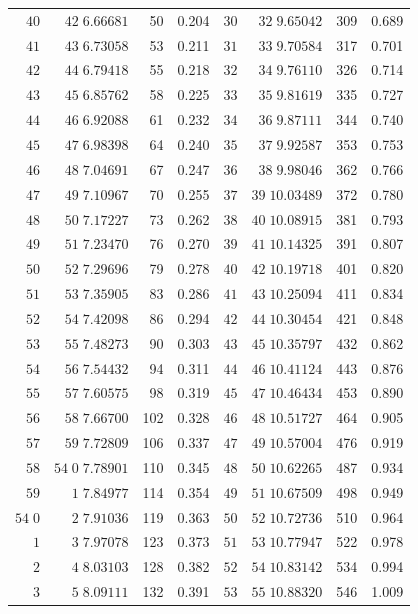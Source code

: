 \begin{center}
\begin{tabular}{|r|r|r|r||r|r|r|r|}
\(40\)&\(42\;6.66681\)&50&0.204&\(30\)&\(32\;9.65042\)&309&0.689\\
\(41\)&\(43\;6.73058\)&53&0.211&\(31\)&\(33\;9.70584\)&317&0.701\\
\(42\)&\(44\;6.79418\)&55&0.218&\(32\)&\(34\;9.76110\)&326&0.714\\
\(43\)&\(45\;6.85762\)&58&0.225&\(33\)&\(35\;9.81619\)&335&0.727\\
\(44\)&\(46\;6.92088\)&61&0.232&\(34\)&\(36\;9.87111\)&344&0.740\\
\(45\)&\(47\;6.98398\)&64&0.240&\(35\)&\(37\;9.92587\)&353&0.753\\
\(46\)&\(48\;7.04691\)&67&0.247&\(36\)&\(38\;9.98046\)&362&0.766\\
\(47\)&\(49\;7.10967\)&70&0.255&\(37\)&\(39\;10.03489\)&372&0.780\\
\(48\)&\(50\;7.17227\)&73&0.262&\(38\)&\(40\;10.08915\)&381&0.793\\
\(49\)&\(51\;7.23470\)&76&0.270&\(39\)&\(41\;10.14325\)&391&0.807\\[3pt]
\(50\)&\(52\;7.29696\)&79&0.278&\(40\)&\(42\;10.19718\)&401&0.820\\
\(51\)&\(53\;7.35905\)&83&0.286&\(41\)&\(43\;10.25094\)&411&0.834\\
\(52\)&\(54\;7.42098\)&86&0.294&\(42\)&\(44\;10.30454\)&421&0.848\\
\(53\)&\(55\;7.48273\)&90&0.303&\(43\)&\(45\;10.35797\)&432&0.862\\
\(54\)&\(56\;7.54432\)&94&0.311&\(44\)&\(46\;10.41124\)&443&0.876\\
\(55\)&\(57\;7.60575\)&98&0.319&\(45\)&\(47\;10.46434\)&453&0.890\\
\(56\)&\(58\;7.66700\)&102&0.328&\(46\)&\(48\;10.51727\)&464&0.905\\
\(57\)&\(59\;7.72809\)&106&0.337&\(47\)&\(49\;10.57004\)&476&0.919\\
\(58\)&\(54\;0\;7.78901\)&110&0.345&\(48\)&\(50\;10.62265\)&487&0.934\\
\(59\)&\(1\;7.84977\)&114&0.354&\(49\)&\(51\;10.67509\)&498&0.949\\[3pt]
\(54\;0\)&\(2\;7.91036\)&119&0.363&\(50\)&\(52\;10.72736\)&510&0.964\\
\(1\)&\(3\;7.97078\)&123&0.373&\(51\)&\(53\;10.77947\)&522&0.978\\
\(2\)&\(4\;8.03103\)&128&0.382&\(52\)&\(54\;10.83142\)&534&0.994\\
\(3\)&\(5\;8.09111\)&132&0.391&\(53\)&\(55\;10.88320\)&546&1.009\\

\end{tabular}
\end{center}
